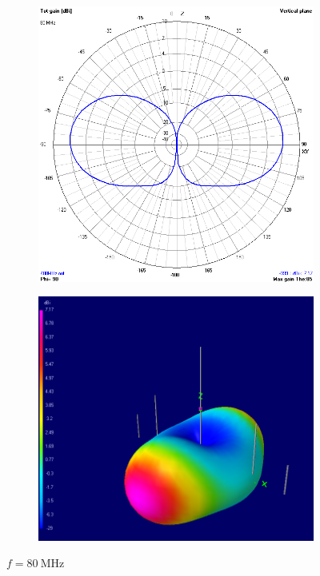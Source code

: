 \begin{figure}[H]
	\begin{subfigure}{0.5\textwidth}
		\includegraphics[scale=0.43]{imagenes/2D_80MHz.png}
	\end{subfigure}	
	\quad
	\begin{subfigure}{0.5\textwidth}
		\includegraphics[scale=0.43]{imagenes/3D_80MHz.png}
	\end{subfigure}
	\caption{$f=\SI{80}{\mega\hertz}$}
	\label{fig.radiacion_80M}
\end{figure}


